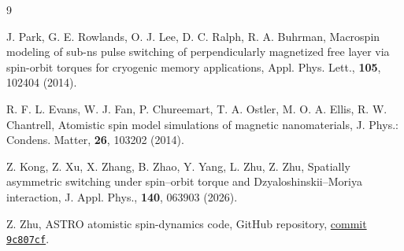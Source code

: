 \begin{thebibliography}{9}

J. Park, G. E. Rowlands, O. J. Lee, D. C. Ralph, R. A. Buhrman,
Macrospin modeling of sub-ns pulse switching of perpendicularly magnetized free
layer via spin-orbit torques for cryogenic memory applications,
Appl. Phys. Lett., \textbf{105}, 102404 (2014).

R. F. L. Evans, W. J. Fan, P. Chureemart, T. A. Ostler, M. O. A. Ellis,
R. W. Chantrell,
Atomistic spin model simulations of magnetic nanomaterials,
J. Phys.: Condens. Matter, \textbf{26}, 103202 (2014).

Z. Kong, Z. Xu, X. Zhang, B. Zhao, Y. Yang, L. Zhu, Z. Zhu,
Spatially asymmetric switching under spin--orbit torque and
Dzyaloshinskii--Moriya interaction,
J. Appl. Phys., \textbf{140}, 063903 (2026).

Z. Zhu,
ASTRO atomistic spin-dynamics code,
GitHub repository, \href{https://github.com/zhuzibn/ASTRO/tree/9c807cfc189dcec7240b0f044831820238613fe1}%
{commit \texttt{9c807cf}}.

\end{thebibliography}
